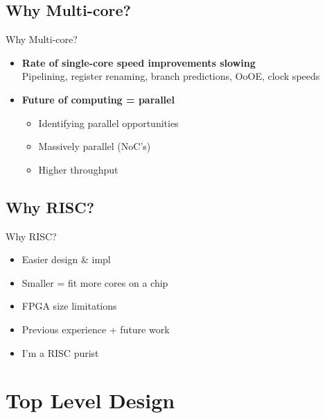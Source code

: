 \documentclass[aspectratio=169]{beamer}
\begin{document}
\subsection{Why Multi-core?}
\begin{frame}{Why Multi-core?}

\begin{itemize}\setlength\itemsep{1em}
    \item{\textbf{Rate of single-core speed improvements slowing}\\
    Pipelining, register renaming, branch predictions, OoOE, clock speeds
    }
    \item{\textbf{Future of computing = parallel}\\
    \begin{itemize}\setlength\itemsep{1em}
        \item Identifying parallel opportunities
        \item Massively parallel (NoC's)
        \item Higher throughput
    \end{itemize}
    }
\end{itemize}
\end{frame}

\subsection{Why RISC?}
\begin{frame}{Why RISC?}
\begin{itemize}\setlength\itemsep{1em}
    \item Easier design \& impl
    \item Smaller = fit more cores on a chip
    \item FPGA size limitations
    \item Previous experience + future work
    \item I'm a RISC purist
\end{itemize}
\end{frame}

\section{Top Level Design}
\frame{\vspace{-1cm}
\tableofcontents[currentsection, subsectionstyle=show/show/hide]}
\end{document}
